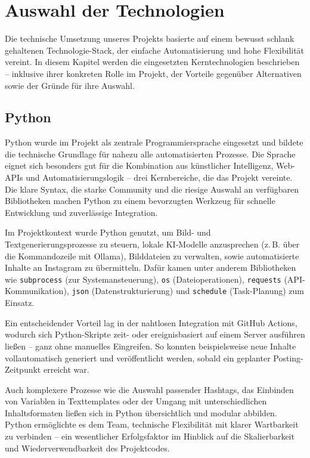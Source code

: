 \documentclass[a4paper,12pt]{article}
\begin{document}
\clearpage

\section{Auswahl der Technologien}
Die technische Umsetzung unseres Projekts basierte auf einem bewusst schlank gehaltenen Technologie-Stack, der einfache Automatisierung und hohe Flexibilität vereint. In diesem Kapitel werden die eingesetzten Kerntechnologien beschrieben – inklusive ihrer konkreten Rolle im Projekt, der Vorteile gegenüber Alternativen sowie der Gründe für ihre Auswahl.

\subsection{Python}

Python wurde im Projekt als zentrale Programmiersprache eingesetzt und bildete die technische Grundlage für nahezu alle automatisierten Prozesse. Die Sprache eignet sich besonders gut für die Kombination aus künstlicher Intelligenz, Web-APIs und Automatisierungslogik – drei Kernbereiche, die das Projekt vereinte. Die klare Syntax, die starke Community und die riesige Auswahl an verfügbaren Bibliotheken machen Python zu einem bevorzugten Werkzeug für schnelle Entwicklung und zuverlässige Integration.

Im Projektkontext wurde Python genutzt, um Bild- und Textgenerierungsprozesse zu steuern, lokale KI-Modelle anzusprechen (z.\,B. über die Kommandozeile mit Ollama), Bilddateien zu verwalten, sowie automatisierte Inhalte an Instagram zu übermitteln. Dafür kamen unter anderem Bibliotheken wie \texttt{subprocess} (zur Systemansteuerung), \texttt{os} (Dateioperationen), \texttt{requests} (API-Kommunikation), \texttt{json} (Datenstrukturierung) und \texttt{schedule} (Task-Planung) zum Einsatz.

Ein entscheidender Vorteil lag in der nahtlosen Integration mit GitHub Actions, wodurch sich Python-Skripte zeit- oder ereignisbasiert auf einem Server ausführen ließen – ganz ohne manuelles Eingreifen. So konnten beispielsweise neue Inhalte vollautomatisch generiert und veröffentlicht werden, sobald ein geplanter Posting-Zeitpunkt erreicht war.

Auch komplexere Prozesse wie die Auswahl passender Hashtags, das Einbinden von Variablen in Texttemplates oder der Umgang mit unterschiedlichen Inhaltsformaten ließen sich in Python übersichtlich und modular abbilden. Python ermöglichte es dem Team, technische Flexibilität mit klarer Wartbarkeit zu verbinden – ein wesentlicher Erfolgsfaktor im Hinblick auf die Skalierbarkeit und Wiederverwendbarkeit des Projektcodes.
\end{document}
